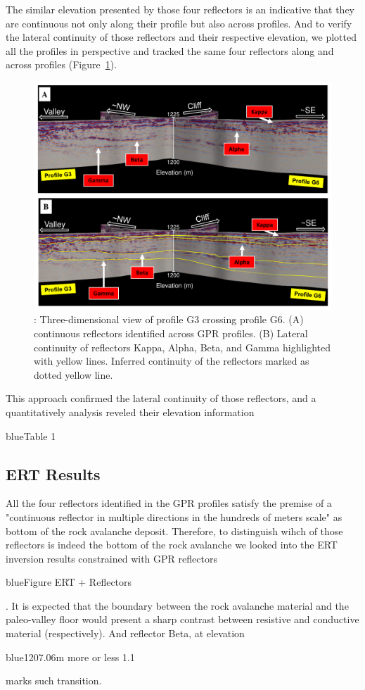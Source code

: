 \documentclass[5p]{elsarticle}
\newcommand{\COMON}{\begin{color}{blue}}
\newcommand{\COMOFF}{\end{color}}
\begin{document}
The similar elevation presented by those four reflectors is an indicative that they are continuous not only along their profile but also across profiles. And to verify the lateral continuity of those reflectors and their respective elevation, we plotted all the profiles in perspective and tracked the same four reflectors along and across profiles (Figure~\ref{Profiles_G3_G6}).						   
								   
								   \begin{figure}[h]

	\includegraphics[width=\textwidth]{Figures/Profiles_G3_G6.pdf}
		\caption{: Three-dimensional view of profile G3 crossing profile G6. (A) continuous reflectors identified across GPR profiles. (B) Lateral continuity of reflectors Kappa, Alpha, Beta, and Gamma highlighted with yellow lines. Inferred continuity of the reflectors marked as dotted yellow line.  \label{Profiles_G3_G6}}

								   \end{figure}
	
This approach confirmed the lateral continuity of those reflectors, and  a quantitatively analysis reveled their elevation information\COMON Table 1 \COMOFF
	

    \subsection {ERT Results}

All the four reflectors identified in the GPR profiles satisfy the premise of a "continuous reflector in multiple directions in the hundreds of meters scale" as bottom of the rock avalanche deposit. Therefore, to distinguish wihch of those reflectors is indeed the bottom of the rock avalanche we looked into the ERT inversion results constrained with GPR reflectors \COMON Figure ERT + Reflectors \COMOFF. It is expected that the boundary between the rock avalanche material and the paleo-valley floor would present a sharp contrast between resistive and conductive material (respectively). And reflector Beta, at elevation \COMON 1207.06m more or less 1.1  \COMOFF marks such transition. 
\end{document}
